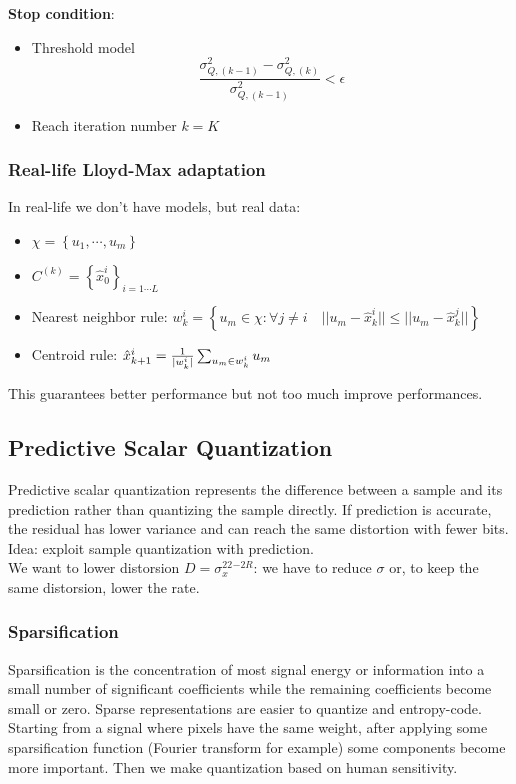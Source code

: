 \textbf{Stop condition}:
\begin{itemize}
    \item Threshold model
    $$\frac{\sigma^2_{Q,(k-1)}-\sigma^2_{Q,(k)}}{\sigma^2_{Q,(k-1)}} < \epsilon$$
    \item Reach iteration number $ k = K$
\end{itemize}
\subsubsection{Real-life Lloyd-Max adaptation}
In real-life we don't have models, but real data:
\begin{itemize}
    \item $\chi = \left\{u_1, \cdots, u_m\right\}$
    \item $C^{(k)} = \left\{\hat{x}_0^i\right\}_{i = 1\cdots L}$
    \item Nearest neighbor rule: $w_k^{i} = \left\{u_m \in \chi : \forall j \neq i \quad ||u_m - \hat{x}_k^i|| \leq ||u_m - \hat{x}_k^j||\right\}$
    \item Centroid rule: $\hat{x}_{k+1}^{i} = \frac{1}{|w_k^i|}\sum_{u_m \in w_k^i}^{}u_m$
\end{itemize}
This guarantees better performance but not too much improve performances.
\subsection{Predictive Scalar Quantization}
Predictive scalar quantization represents the difference between a sample and its prediction rather than quantizing the sample directly. If prediction is accurate, the residual has lower variance and can reach the same distortion with fewer bits.
Idea: exploit sample quantization with prediction.\\
We want to lower distorsion $D = \sigma_x^22^{-2R}$: we have to reduce $\sigma$ or, to keep the same distorsion, lower the rate.
\subsubsection{Sparsification}
Sparsification is the concentration of most signal energy or information into a small number of significant coefficients while the remaining coefficients become small or zero. Sparse representations are easier to quantize and entropy-code.
Starting from a signal where pixels have the same weight, after applying some sparsification function (Fourier transform for example) some components become more important. Then we make quantization based on human sensitivity.
